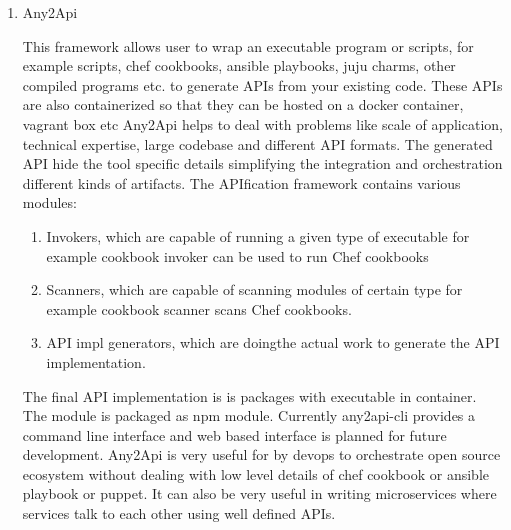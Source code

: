 \begin{enumerate}
\item {} 
Any2Api

This framework \label{\detokenize{i524/technologies:id617}}{\hyperref[\detokenize{i524/technologies:wettinger-any2api}]{\sphinxcrossref{{[}532{]}}}} allows user to wrap an
executable program or scripts, for example scripts, chef
cookbooks, ansible playbooks, juju charms, other compiled
programs etc. to generate APIs from your existing code.  These
APIs are also containerized so that they can be hosted on a
docker container, vagrant box etc Any2Api helps to deal with
problems like scale of application, technical expertise, large
codebase and different API formats. The generated API hide the
tool specific details simplifying the integration and
orchestration different kinds of artifacts. The APIfication
framework contains various modules:
\begin{enumerate}
\item {} 
Invokers, which are capable of running a given type of
executable for example cookbook invoker can be used to run Chef
cookbooks

\item {} 
Scanners, which are capable of scanning modules of certain type for
example cookbook scanner scans Chef cookbooks.

\item {} 
API impl generators, which are doingthe actual work to
generate the API implementation.

\end{enumerate}

The final API implementation \label{\detokenize{i524/technologies:id618}}{\hyperref[\detokenize{i524/technologies:www-any2api}]{\sphinxcrossref{{[}533{]}}}} is is packages
with executable in container.  The module is packaged as npm
module. Currently any2api-cli provides a command line interface
and web based interface is planned for future
development. Any2Api is very useful for by devops to orchestrate
open source ecosystem without dealing with low level details of
chef cookbook or ansible playbook or puppet. It can also be very
useful in writing microservices where services talk to each other
using well defined APIs.

\end{enumerate}


